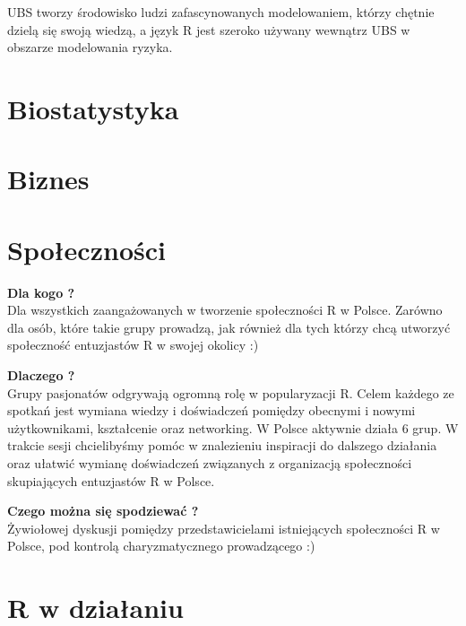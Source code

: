 \documentclass[11pt,twoside,b5paper]{book}
\begin{document}
UBS tworzy środowisko ludzi zafascynowanych modelowaniem, którzy chętnie dzielą się swoją wiedzą, a język R jest szeroko używany wewnątrz UBS w obszarze modelowania ryzyka.



\newpage
\section{Biostatystyka}





\newpage
\section{Biznes}

\newpage



\newpage
\section{Społeczności}
\textbf{Dla kogo ?} \\
Dla wszystkich zaangażowanych w tworzenie społeczności R w Polsce. Zarówno dla osób, które takie grupy prowadzą, jak również dla tych którzy chcą utworzyć społeczność entuzjastów R w swojej okolicy :)

\textbf{Dlaczego ?}\\
Grupy pasjonatów odgrywają ogromną rolę w popularyzacji R. Celem każdego ze spotkań jest wymiana wiedzy i doświadczeń pomiędzy obecnymi i nowymi użytkownikami, kształcenie oraz networking. W Polsce aktywnie działa 6 grup. W trakcie sesji chcielibyśmy pomóc w znalezieniu inspiracji do dalszego działania oraz ułatwić wymianę doświadczeń związanych z organizacją społeczności skupiających entuzjastów R w Polsce.

\textbf{Czego można się spodziewać ?}\\
Żywiołowej dyskusji pomiędzy przedstawicielami istniejących społeczności R w Polsce, pod kontrolą charyzmatycznego prowadzącego :)
\newpage
\section{R w działaniu}


\newpage

\newpage
\end{document}
